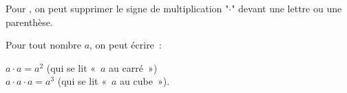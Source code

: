 

\begin{aconnaitre}
Pour , on peut supprimer le signe de multiplication "$\cdot$" devant une lettre ou une parenthèse.
\end{aconnaitre}

\begin{aconnaitre}
\begin{minipage}[t]{0.38\linewidth}
Pour tout nombre $a$, on peut écrire : 
 \end{minipage} \hfill%
\begin{minipage}[t]{0.58\linewidth}
\textcolor{H1}{$a \cdot a = a^2$} (qui se lit  « $a$ au carré ») \\[0.5em]
\textcolor{H1}{$a \cdot a \cdot a = a^3$} (qui se lit « $a$ au cube »).
 \end{minipage} \\
\end{aconnaitre}

